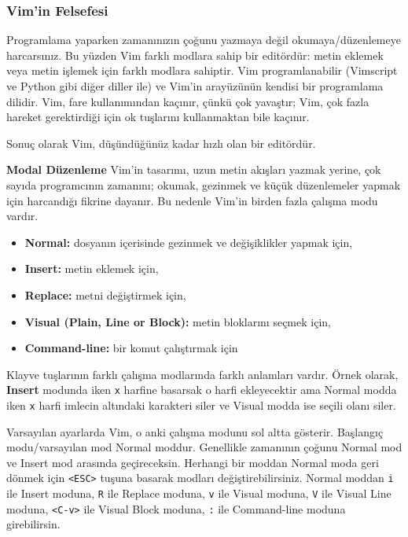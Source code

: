 \documentclass[
]{book}
\providecommand{\tightlist}{%
  \setlength{\itemsep}{0pt}\setlength{\parskip}{0pt}}
\begin{document}
\hypertarget{vimin-felsefesi}{%
\subsubsection*{Vim'in Felsefesi}\label{vimin-felsefesi}}

Programlama yaparken zamanınızın çoğunu yazmaya değil okumaya/düzenlemeye harcarsınız. Bu yüzden Vim farklı modlara sahip bir editördür: metin eklemek veya metin işlemek için farklı modlara sahiptir. Vim programlanabilir (Vimscript ve Python gibi diğer diller ile) ve Vim'in arayüzünün kendisi bir programlama dilidir. Vim, fare kullanımından kaçınır, çünkü çok yavaştır; Vim, çok fazla hareket gerektirdiği için ok tuşlarını kullanmaktan bile kaçınır.

Sonuç olarak Vim, düşündüğünüz kadar hızlı olan bir editördür.

\textbf{Modal Düzenleme}
Vim'in tasarımı, uzun metin akışları yazmak yerine, çok sayıda programcının zamanını; okumak, gezinmek ve küçük düzenlemeler yapmak için harcandığı fikrine dayanır. Bu nedenle Vim'in birden fazla çalışma modu vardır.

\begin{itemize}
\tightlist
\item
  \textbf{Normal:} dosyanın içerisinde gezinmek ve değişiklikler yapmak için,
\item
  \textbf{Insert:} metin eklemek için,
\item
  \textbf{Replace:} metni değiştirmek için,
\item
  \textbf{Visual (Plain, Line or Block):} metin bloklarını seçmek için,
\item
  \textbf{Command-line:} bir komut çalıştırmak için
\end{itemize}

Klayve tuşlarının farklı çalışma modlarında farklı anlamları vardır. Örnek olarak, \textbf{Insert} modunda iken \texttt{x} harfine basarsak o harfi ekleyecektir ama Normal modda iken \texttt{x} harfi imlecin altındaki karakteri siler ve Visual modda ise seçili olanı siler.

Varsayılan ayarlarda Vim, o anki çalışma modunu sol altta gösterir. Başlangıç modu/varsayılan mod Normal moddur. Genellikle zamanının çoğunu Normal mod ve Insert mod arasında geçireceksin. Herhangi bir moddan Normal moda geri dönmek için \texttt{\textless{}ESC\textgreater{}} tuşuna basarak modları değiştirebilirsiniz. Normal moddan \texttt{i} ile Insert moduna, \texttt{R} ile Replace moduna, \texttt{v} ile Visual moduna, \texttt{V} ile Visual Line moduna, \texttt{\textless{}C-v\textgreater{}} ile Visual Block moduna, \texttt{:} ile Command-line moduna girebilirsin.
\end{document}

